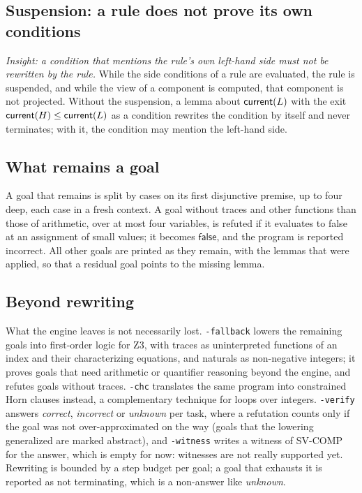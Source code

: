 \subsection{Suspension: a rule does not prove its own conditions}\label{sec:engine:suspend}
\emph{Insight: a condition that mentions the rule's own left-hand side must not be rewritten by the rule.}
While the side conditions of a rule are evaluated, the rule is suspended, and while the view of a component
is computed, that component is not projected. Without the suspension, a lemma about $\mathsf{current}(L)$ with the exit
$\mathsf{current}(H) \le \mathsf{current}(L)$ as a condition rewrites the condition by itself and never terminates; with it, the
condition may mention the left-hand side.

\subsection{What remains a goal}\label{sec:engine:remains}
A goal that remains is split by cases on its first disjunctive premise, up to four deep, each case in a fresh
context. A goal without traces and other functions than those of arithmetic, over at most four variables, is
refuted if it evaluates to false at an assignment of small values; it becomes $\mathsf{false}$, and the
program is reported incorrect. All other goals are printed as they remain, with the lemmas that were applied,
so that a residual goal points to the missing lemma.

\subsection{Beyond rewriting}\label{sec:engine:beyond}
What the engine leaves is not necessarily lost. \texttt{-fallback} lowers the remaining goals into first-order
logic for Z3, with traces as uninterpreted functions of an index and their characterizing equations, and naturals
as non-negative integers; it proves goals that need arithmetic or quantifier reasoning beyond the engine, and
refutes goals without traces. \texttt{-chc} translates the same program into constrained Horn clauses instead, a
complementary technique for loops over integers. \texttt{-verify} answers \emph{correct}, \emph{incorrect} or
\emph{unknown} per task, where a refutation counts only if the goal was not over-approximated on the way (goals that
the lowering generalized are marked abstract), and \texttt{-witness} writes a witness of SV-COMP for the answer,
which is empty for now: witnesses are not really supported yet. Rewriting is bounded by a step budget per goal; a goal that exhausts it is reported as
not terminating, which is a non-answer like \emph{unknown}.
